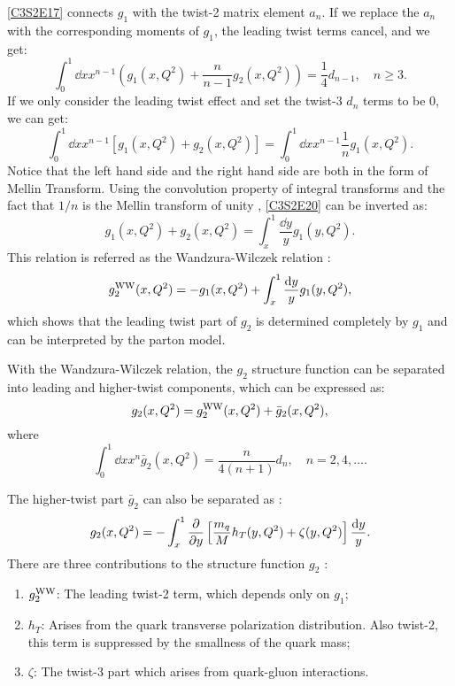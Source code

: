\cref{C3S2E17} connects $g_1$ with the twist-2 matrix element $a_n$. If we replace the $a_n$ with the corresponding moments of $g_1$, the leading twist terms cancel, and we get:
\begin{equation} \label{C3S2E19}
\int_0^1\dd{x}x^{n-1}\left(g_1(x,Q^2)+\frac{n}{n-1}g_2(x,Q^2)\right) = \frac{1}{4}d_{n-1}, \quad n \geq 3.
\end{equation}
If we only consider the leading twist effect and set the twist-3 $d_n$ terms to be 0, we can get:
\begin{equation} \label{C3S2E20}
\int_0^1\dd{x}x^{n-1}[g_1(x,Q^2)+g_2(x,Q^2)] = \int_0^1\dd{x}x^{n-1}\frac{1}{n}g_1(x,Q^2).
\end{equation}
Notice that the left hand side and the right hand side are both in the form of Mellin Transform. Using the convolution property of integral transforms and the fact that $1/n$ is the Mellin transform of unity \cite{Barone2003}, \cref{C3S2E20} can be inverted as:
\begin{equation} \label{C3S2E21}
g_1(x,Q^2)+g_2(x,Q^2) = \int_x^1\frac{\dd{y}}{y}g_1(y,Q^2).
\end{equation}
This relation is referred as the Wandzura-Wilczek relation \cite{Wandzura1977}:
\begin{equation} \label{C3S2E22}
g_2^{\mathrm{WW}}(x,Q^2) = -g_1(x,Q^2)+\int_x^1\frac{\dd{y}}{y}g_1(y,Q^2),
\end{equation}
which shows that the leading twist part of $g_2$ is determined completely by $g_1$ and can be interpreted by the parton model.

With the Wandzura-Wilczek relation, the $g_2$ structure function can be separated into leading and higher-twist components, which can be expressed as:
\begin{equation} \label{C3S2E23}
g_2(x,Q^2) = g_2^{\mathrm{WW}}(x,Q^2)+\bar{g}_2(x,Q^2),
\end{equation}
where
\begin{equation} \label{C3S2E24}
\int_0^1\dd{x}x^n\bar{g}_2(x,Q^2) = \frac{n}{4(n+1)}d_n, \quad n = 2,4,\dots.
\end{equation}

The higher-twist part $\bar{g}_2$ can also be separated as \cite{Slifer2004}:
\begin{equation} \label{C3S2E25}
g_2(x,Q^2) = -\int_x^1\pdv{y}\left[\frac{m_q}{M}h_T(y,Q^2)+\zeta(y,Q^2)\right]\frac{\dd{y}}{y}.
\end{equation}
There are three contributions to the structure function $g_2$ \cite{G2P}:
\begin{enumerate}
\item $g_2^{\mathrm{WW}}$: The leading twist-2 term, which depends only on $g_1$;
\item $h_T$: Arises from the quark transverse polarization distribution. Also twist-2, this term is suppressed by the smallness of the quark mass;
\item $\zeta$: The twist-3 part which arises from quark-gluon interactions.
\end{enumerate}

